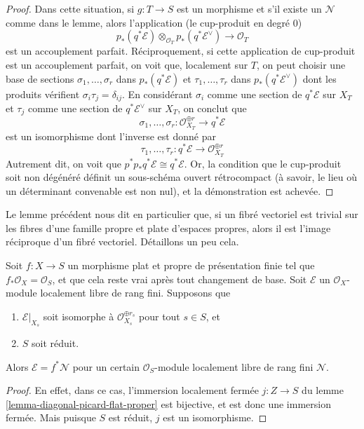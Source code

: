 \begin{proof}
\medskip\noindent
Dans cette situation, si $g : T \to S$ est un morphisme et s'il existe un
$\mathcal{N}$ comme dans le lemme, alors l'application (le cup-produit en degré $0$)
$$
p_*(q^*\mathcal{E})
\otimes_{\mathcal{O}_T}
p_*(q^*\mathcal{E}^\vee)
\longrightarrow \mathcal{O}_T
$$
est un accouplement parfait. Réciproquement, si cette application de cup-produit est un
accouplement parfait, on voit que, localement sur $T$, on peut choisir une
base de sections
$\sigma_1, \ldots, \sigma_r$ dans $p_*(q^*\mathcal{E})$
et $\tau_1, \ldots, \tau_r$ dans $p_*(q^*\mathcal{E}^\vee)$
dont les produits vérifient $\sigma_i \tau_j = \delta_{ij}$.
En considérant $\sigma_i$ comme une section de $q^*\mathcal{E}$ sur $X_T$
et $\tau_j$ comme une section de $q^*\mathcal{E}^\vee$ sur $X_T$,
on conclut que
$$
\sigma_1, \ldots, \sigma_r :
\mathcal{O}_{X_T}^{\oplus r}
\longrightarrow
q^*\mathcal{E}
$$
est un isomorphisme dont l'inverse est donné par
$$
\tau_1, \ldots, \tau_r :
q^*\mathcal{E}
\longrightarrow
\mathcal{O}_{X_T}^{\oplus r}
$$
Autrement dit, on voit que $p^*p_*q^*\mathcal{E} \cong q^*\mathcal{E}$.
Or, la condition que le cup-produit soit non dégénéré définit
un sous-schéma ouvert rétrocompact (à savoir, le lieu où un déterminant
convenable est non nul), et la démonstration est achevée.
\end{proof}

\noindent
Le lemme précédent nous dit en particulier que, si un fibré vectoriel est
trivial sur les fibres d'une famille propre et plate d'espaces propres, alors
il est l'image réciproque d'un fibré vectoriel. Détaillons un peu cela.

\begin{lemma}
\label{lemma-trivial-on-fibres}
Soit $f : X \to S$ un morphisme plat et propre de présentation finie
tel que $f_*\mathcal{O}_X = \mathcal{O}_S$, et que cela reste
vrai après tout changement de base. Soit $\mathcal{E}$ un
$\mathcal{O}_X$-module localement libre de rang fini. Supposons que
\begin{enumerate}
\item $\mathcal{E}|_{X_s}$ soit isomorphe à
$\mathcal{O}_{X_s}^{\oplus r_s}$ pour tout $s \in S$, et
\item $S$ soit réduit.
\end{enumerate}
Alors $\mathcal{E} = f^*\mathcal{N}$ pour un certain
$\mathcal{O}_S$-module localement libre de rang fini $\mathcal{N}$.
\end{lemma}

\begin{proof}
En effet, dans ce cas, l'immersion localement fermée $j : Z \to S$ du
lemme \ref{lemma-diagonal-picard-flat-proper}
est bijective, et est donc une
immersion fermée. Mais puisque $S$ est réduit, $j$ est un isomorphisme.
\end{proof}

